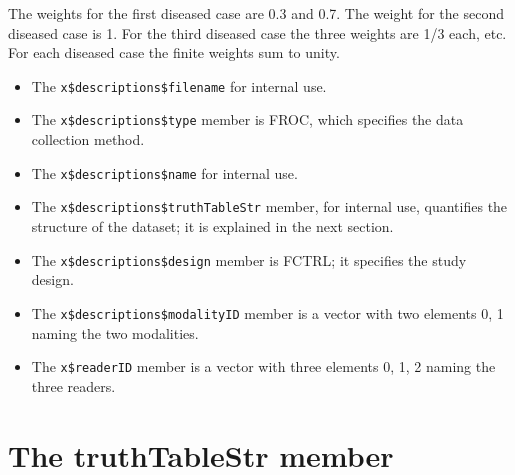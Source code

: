 \documentclass[
]{book}
\newenvironment{Shaded}{\begin{snugshade}}{\end{snugshade}}
\newcommand{\CommentTok}[1]{\textcolor[rgb]{0.56,0.35,0.01}{\textit{#1}}}
\newcommand{\KeywordTok}[1]{\textcolor[rgb]{0.13,0.29,0.53}{\textbf{#1}}}
\newcommand{\NormalTok}[1]{#1}
\newcommand{\OperatorTok}[1]{\textcolor[rgb]{0.81,0.36,0.00}{\textbf{#1}}}
\providecommand{\tightlist}{%
  \setlength{\itemsep}{0pt}\setlength{\parskip}{0pt}}
\begin{document}
The weights for the first diseased case are 0.3 and 0.7. The weight for the second diseased case is 1. For the third diseased case the three weights are 1/3 each, etc. For each diseased case the finite weights sum to unity.

\begin{Shaded}
\end{Shaded}

\begin{itemize}
\tightlist
\item
  The \texttt{x\$descriptions\$filename} for internal use.
\item
  The \texttt{x\$descriptions\$type} member is FROC, which specifies the data collection method.
\item
  The \texttt{x\$descriptions\$name} for internal use.
\item
  The \texttt{x\$descriptions\$truthTableStr} member, for internal use, quantifies the structure of the dataset; it is explained in the next section.
\item
  The \texttt{x\$descriptions\$design} member is FCTRL; it specifies the study design.
\item
  The \texttt{x\$descriptions\$modalityID} member is a vector with two elements 0, 1 naming the two modalities.
\item
  The \texttt{x\$readerID} member is a vector with three elements 0, 1, 2 naming the three readers.
\end{itemize}

\hypertarget{dataset-object-truth-table-str}{%
\section{The truthTableStr member}\label{dataset-object-truth-table-str}}
\end{document}
